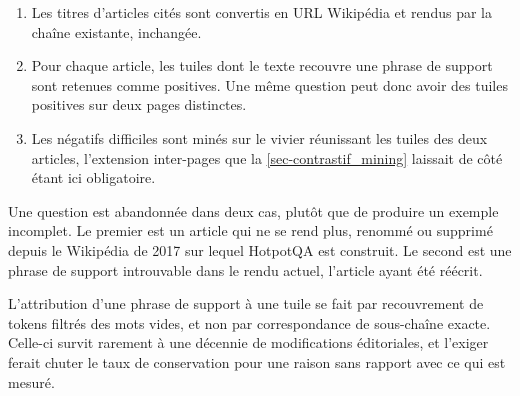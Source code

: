\begin{enumerate}
\item Les titres d'articles cités sont convertis en URL Wikipédia et rendus par la
chaîne existante, inchangée.
\item Pour chaque article, les tuiles dont le texte recouvre une phrase de support
sont retenues comme positives. Une même question peut donc avoir des tuiles
positives sur deux pages distinctes.
\item Les négatifs difficiles sont minés sur le vivier réunissant les tuiles des
deux articles, l'extension inter-pages que la \cref{sec-contrastif_mining} laissait
de côté étant ici obligatoire.
\end{enumerate}
 
Une question est abandonnée dans deux cas, plutôt que de produire un exemple
incomplet. Le premier est un article qui ne se rend plus, renommé ou supprimé
depuis le  Wikipédia de 2017 sur lequel HotpotQA est construit. Le
second est une phrase de support introuvable dans le rendu actuel, l'article ayant
été réécrit.
 
L'attribution d'une phrase de support à une tuile se fait par recouvrement de
tokens filtrés des mots vides, et non par correspondance de sous-chaîne exacte.
Celle-ci survit rarement à une décennie de modifications éditoriales, et l'exiger
ferait chuter le taux de conservation pour une raison sans rapport avec ce qui est
mesuré.
